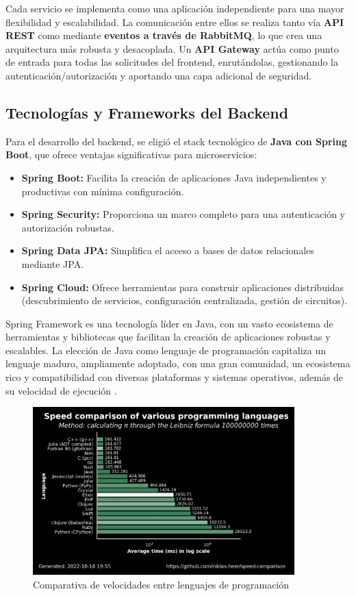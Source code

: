 Cada servicio se implementa como una aplicación independiente para una mayor flexibilidad y escalabilidad. La comunicación entre ellos se realiza tanto vía \textbf{API REST} como mediante \textbf{eventos a través de RabbitMQ}, lo que crea una arquitectura más robusta y desacoplada. Un \textbf{API Gateway} actúa como punto de entrada para todas las solicitudes del frontend, enrutándolas, gestionando la autenticación/autorización y aportando una capa adicional de seguridad.

\subsection{Tecnologías y Frameworks del Backend}

Para el desarrollo del backend, se eligió el stack tecnológico de \textbf{Java con Spring Boot}, que ofrece ventajas significativas para microservicios:

\begin{itemize}
    \item \textbf{Spring Boot:} Facilita la creación de aplicaciones Java independientes y productivas con mínima configuración.
    \item \textbf{Spring Security:} Proporciona un marco completo para una autenticación y autorización robustas.
    \item \textbf{Spring Data JPA:} Simplifica el acceso a bases de datos relacionales mediante JPA.
    \item \textbf{Spring Cloud:} Ofrece herramientas para construir aplicaciones distribuidas (descubrimiento de servicios, configuración centralizada, gestión de circuitos).
\end{itemize}

Spring Framework es una tecnología líder en Java, con un vasto ecosistema de herramientas y bibliotecas que facilitan la creación de aplicaciones robustas y escalables. La elección de Java como lenguaje de programación capitaliza un lenguaje maduro, ampliamente adoptado, con una gran comunidad, un ecosistema rico y compatibilidad con diversas plataformas y sistemas operativos, además de su velocidad de ejecución \cite{speed_comparison}.

\begin{figure}[H]
    \centering
    \includegraphics[width=0.9\textwidth]{figures/06_comp.png}
    \caption{Comparativa de velocidades entre lenguajes de programación}
    \label{fig:programming_languages_speed}
\end{figure}

